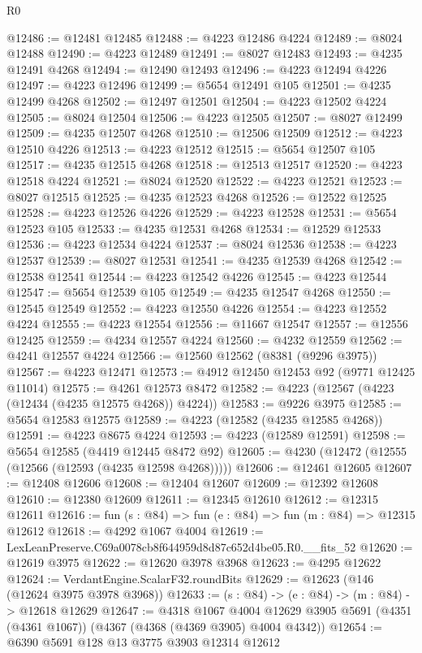 \begin{lexlean}{R0}
\begin{coremodule}
@12486 := @12481 @12485
@12488 := @4223 @12486 @4224
@12489 := @8024 @12488
@12490 := @4223 @12489
@12491 := @8027 @12483
@12493 := @4235 @12491 @4268
@12494 := @12490 @12493
@12496 := @4223 @12494 @4226
@12497 := @4223 @12496
@12499 := @5654 @12491 @105
@12501 := @4235 @12499 @4268
@12502 := @12497 @12501
@12504 := @4223 @12502 @4224
@12505 := @8024 @12504
@12506 := @4223 @12505
@12507 := @8027 @12499
@12509 := @4235 @12507 @4268
@12510 := @12506 @12509
@12512 := @4223 @12510 @4226
@12513 := @4223 @12512
@12515 := @5654 @12507 @105
@12517 := @4235 @12515 @4268
@12518 := @12513 @12517
@12520 := @4223 @12518 @4224
@12521 := @8024 @12520
@12522 := @4223 @12521
@12523 := @8027 @12515
@12525 := @4235 @12523 @4268
@12526 := @12522 @12525
@12528 := @4223 @12526 @4226
@12529 := @4223 @12528
@12531 := @5654 @12523 @105
@12533 := @4235 @12531 @4268
@12534 := @12529 @12533
@12536 := @4223 @12534 @4224
@12537 := @8024 @12536
@12538 := @4223 @12537
@12539 := @8027 @12531
@12541 := @4235 @12539 @4268
@12542 := @12538 @12541
@12544 := @4223 @12542 @4226
@12545 := @4223 @12544
@12547 := @5654 @12539 @105
@12549 := @4235 @12547 @4268
@12550 := @12545 @12549
@12552 := @4223 @12550 @4226
@12554 := @4223 @12552 @4224
@12555 := @4223 @12554
@12556 := @11667 @12547
@12557 := @12556 @12425
@12559 := @4234 @12557 @4224
@12560 := @4232 @12559
@12562 := @4241 @12557 @4224
@12566 := @12560 @12562 (@8381 (@9296 @3975))
@12567 := @4223 @12471
@12573 := @4912 @12450 @12453 @92 (@9771 @12425 @11014)
@12575 := @4261 @12573 @8472
@12582 := @4223 (@12567 (@4223 (@12434 (@4235 @12575 @4268)) @4224))
@12583 := @9226 @3975
@12585 := @5654 @12583 @12575
@12589 := @4223 (@12582 (@4235 @12585 @4268))
@12591 := @4223 @8675 @4224
@12593 := @4223 (@12589 @12591)
@12598 := @5654 @12585 (@4419 @12445 @8472 @92)
@12605 := @4230 (@12472 (@12555 (@12566 (@12593 (@4235 @12598 @4268)))))
@12606 := @12461 @12605
@12607 := @12408 @12606
@12608 := @12404 @12607
@12609 := @12392 @12608
@12610 := @12380 @12609
@12611 := @12345 @12610
@12612 := @12315 @12611
@12616 := fun (s : @84) => fun (e : @84) => fun (m : @84) => @12315 @12612
@12618 := @4292 @1067 @4004
@12619 := LexLeanPreserve.C69a0078cb8f644959d8d87c652d4be05.R0.__fits_52
@12620 := @12619 @3975
@12622 := @12620 @3978 @3968
@12623 := @4295 @12622
@12624 := VerdantEngine.ScalarF32.roundBits
@12629 := @12623 (@146 (@12624 @3975 @3978 @3968))
@12633 := (s : @84) -> (e : @84) -> (m : @84) -> @12618 @12629
@12647 := @4318
    @1067
    @4004
    @12629
    @3905
    @5691
    (@4351 (@4361 @1067))
    (@4367 (@4368 (@4369 @3905) @4004 @4342))
@12654 := @6390 @5691 @128 @13 @3775 @3903 @12314 @12612

\end{coremodule}
\end{lexlean}
